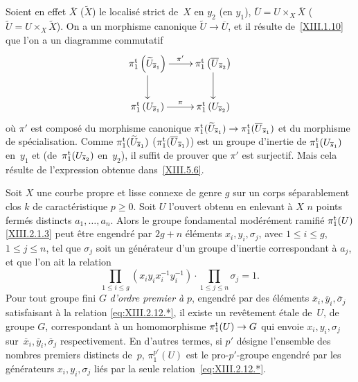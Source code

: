 Soient en effet $\overline{X}$ (\resp $\widetilde{X}$) le localis\'e
strict de~$X$ en $y_2$ (\resp en $y_1$), $\overline{U}=U \times_X
\overline{X}$ (\resp $\widetilde{U}=U\times_X \widetilde{X}$). On a un
morphisme canonique $\widetilde{U}\to \overline{U}$, et il
r\'esulte de~\ref{XIII.1.10} que l'on a un diagramme commutatif
$$
\xymatrix{{\pi_1^{\tame} \left(\widetilde{U}_{\overline{s}_1} \right)}\ar[r]^{\pi '}\ar[d]&{\pi_1^{\tame} \left(
\overline{U}_{\overline{s}_2} \right)}\ar[d]\\{\pi_1^{\tame} \left(
U_{\overline{s}_1} \right)}\ar[r]^{\pi }&{\pi_1^{\tame} \left(
U_{\overline{s}_2} \right)}}
$$
o\`u $\pi'$ est compos\'e du morphisme canonique
$\pi_1^{\tame}(\widetilde{U}_ {\overline{s}_1})\to
\pi_1^{\tame}(\overline{U}_{\overline{s}_1})$ et du morphisme de
sp\'ecialisation. Comme
$\pi_1^{\mathrm{t}}(\widetilde{U}_{\overline{s}_1})$
(\resp $\pi_1^{\mathrm{t}}(\overline{U}_{\overline{s}_1})$)
est un groupe d'inertie de
$\pi_1^{\mathrm{t}}(U_{\overline{s}_1})$ en~$y_1$ et (\resp de~$\pi_1^{\mathrm{t}}(U_{\overline{s}_2})$ en~$y_2$), il suffit de
prouver que $\pi'$ est surjectif. Mais cela r\'esulte de
l'expression obtenue dans~\ref{XIII.5.6}.

\begin{corollaire}
\label{XIII.2.12}
Soit $X$ une courbe propre et lisse connexe de genre $g$ sur un corps
s\'e\-pa\-ra\-blement clos $k$ de caract\'eristique $p\geq
0$. Soit $U$ l'ouvert obtenu en enlevant \`a $X$ $n$ points
ferm\'es distincts $a_1,\dots,a_n$. Alors le groupe fondamental
mod\'er\'ement ramifi\'e $\pi_1^{\mathrm{t}}(U)$ \eqref{XIII.2.1.3}
peut \^etre engendr\'e par $2g+n$ \'el\'ements $x_i,
y_i,\sigma_j$, avec $1\leq i\leq g$, $1\leq j\leq n$, tel que
$\sigma_j$ soit un g\'en\'erateur d'un groupe d'inertie
correspondant \`a $a_j$, et que l'on ait la relation
\begin{equation*}
\label{eq:XIII.2.12.*}
\tag{$*$} \prod_{1\leq i\leq
g}(x_iy_ix^{-1}_iy^{-1}_i)\cdot\prod_{1\leq j\leq n}\sigma_j=1.
\end{equation*}
Pour tout groupe fini $G$ \emph{d'ordre premier à} $p$,
engendr\'e par des \'el\'ements $\overline{x}_i,
\overline{y}_i,\overline{\sigma}_j$ satisfaisant \`a la relation
\eqref{eq:XIII.2.12.*}, il existe un rev\^etement \'etale de~$U$,
de groupe $G$, correspondant \`a un homomorphisme
$\pi_1^{\tame}(U)\to G$ qui
envoie $x_i, y_i,\sigma_j$ sur~$\overline{x}_i,
\overline{y}_i,\overline{\sigma}_j$ respectivement. En d'autres
termes, si $p'$ d\'esigne l'ensemble des nombres premiers distincts
de~$p$, $\pi_1^{p'}(U)$ est le pro-$p'$-groupe engendr\'e par les
g\'en\'erateurs $x_i, y_i,\sigma_j$ li\'es par la seule relation~\eqref{eq:XIII.2.12.*}.
\end{corollaire}

